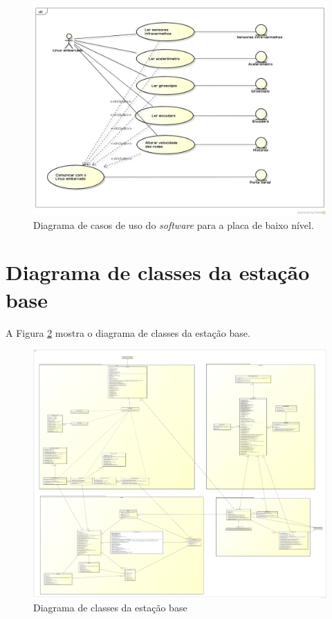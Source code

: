 \begin{figure}[H]
  \centering
  \includegraphics[width=\textwidth, keepaspectratio]{./figuras/sistEmbarcado/usecase_placa_baixo_nivel.jpg}
  \caption{Diagrama de casos de uso do \textit{software} para a placa de baixo nível.}
  \label{fig:diagrama_caso_uso_placa_embarcada}
\end{figure}

\section{Diagrama de classes da estação base}

A Figura \ref{fig:diagrama_classes_estacao_base} mostra o diagrama de classes da estação base.
\begin{figure}[H]
  \centering
  \includegraphics[width=\textwidth]{./figuras/estacaoBase/class_estacaoBase.jpg}
  \caption{Diagrama de classes da estação base}
  \label{fig:diagrama_classes_estacao_base}
\end{figure}

